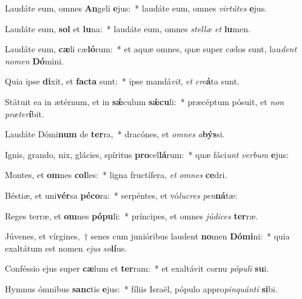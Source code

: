 \item Laudáte eum, omnes \textbf{An}geli \textbf{e}jus:~* laudáte eum, omnes \textit{vir}\textit{tú}\textit{tes} \textbf{e}jus.
\item Laudáte eum, \textbf{sol} et \textbf{lu}na:~* laudáte eum, omnes \textit{stel}\textit{læ} \textit{et} \textbf{lu}men.
\item Laudáte eum, \textbf{cæ}li cæ\textbf{ló}rum:~* et aquæ omnes, quæ super cælos sunt, lau\textit{dent} \textit{no}\textit{men} \textbf{Dó}mini.
\item Quia ipse \textbf{di}xit, et \textbf{fac}\textbf{ta} sunt:~* ipse mandá\textit{vit}, \textit{et} \textit{cre}\textbf{á}ta sunt.
\item Státuit ea in ætérnum, et in \textbf{sǽ}culum \textbf{sǽ}\textbf{cu}li:~* præcéptum pósuit, et \textit{non} \textit{præ}\textit{ter}\textbf{í}bit.
\item Laudáte Dómi\textbf{num} de \textbf{ter}ra,~* dracónes, et \textit{om}\textit{nes} \textit{a}\textbf{býs}si.
\item Ignis, grando, nix, glácies, spíritus \textbf{pro}cel\textbf{lá}rum:~* quæ fáci\textit{unt} \textit{ver}\textit{bum} \textbf{e}jus:
\item Montes, et \textbf{om}nes \textbf{col}les:~* ligna fructífera, \textit{et} \textit{om}\textit{nes} \textbf{ce}dri.
\item Béstiæ, et uni\textbf{vér}sa \textbf{pé}\textbf{co}ra:~* serpéntes, et vó\textit{lu}\textit{cres} \textit{pen}\textbf{ná}tæ:
\item Reges terræ, et \textbf{om}nes \textbf{pó}\textbf{pu}li:~* príncipes, et omnes \textit{jú}\textit{di}\textit{ces} \textbf{ter}ræ.
\item Júvenes, et vírgines,~† senes cum junióribus laudent \textbf{no}men \textbf{Dó}\textbf{mi}ni:~* quia exaltátum est nomen \textit{e}\textit{jus} \textit{so}\textbf{lí}us.
\item Conféssio ejus super \textbf{cæ}lum et \textbf{ter}ram:~* et exaltávit cornu \textit{pó}\textit{pu}\textit{li} \textbf{su}i.
\item Hymnus ómnibus \textbf{sanc}tis \textbf{e}jus:~* fíliis Israël, pópulo appro\textit{pin}\textit{quán}\textit{ti} \textbf{si}bi.
